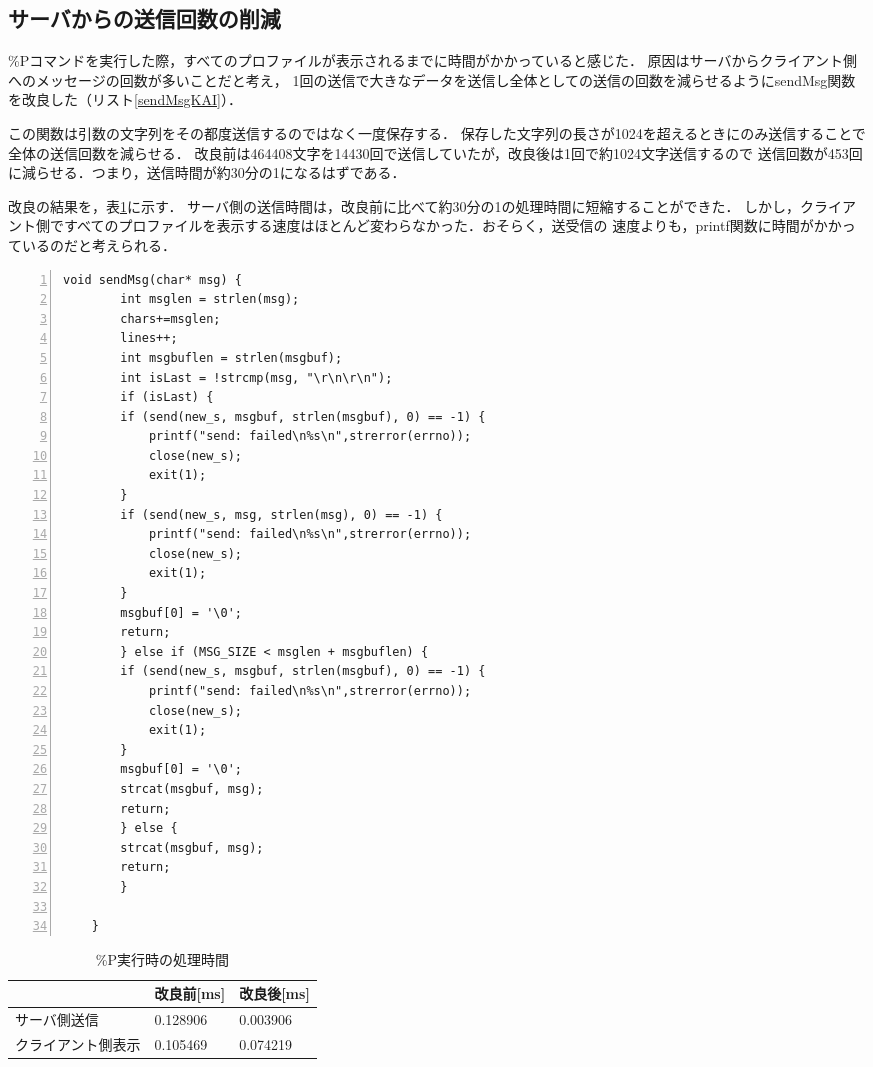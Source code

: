 \documentclass[11pt]{jarticle}
\begin{document}
\subsection{サーバからの送信回数の削減}

\%Pコマンドを実行した際，すべてのプロファイルが表示されるまでに時間がかかっていると感じた．
原因はサーバからクライアント側へのメッセージの回数が多いことだと考え，
1回の送信で大きなデータを送信し全体としての送信の回数を減らせるようにsendMsg関数を改良した（リスト\ref{sendMsgKAI}）．

この関数は引数の文字列をその都度送信するのではなく一度保存する．
保存した文字列の長さが1024を超えるときにのみ送信することで全体の送信回数を減らせる．
改良前は464408文字を14430回で送信していたが，改良後は1回で約1024文字送信するので
送信回数が453回に減らせる．つまり，送信時間が約30分の1になるはずである．

改良の結果を，表\ref{table:P}に示す．
サーバ側の送信時間は，改良前に比べて約30分の1の処理時間に短縮することができた．
しかし，クライアント側ですべてのプロファイルを表示する速度はほとんど変わらなかった．おそらく，送受信の
速度よりも，printf関数に時間がかかっているのだと考えられる．

\begin{lstlisting}[caption=改良したsendMsg,label=sendMsgKAI,numbers=left]
    void sendMsg(char* msg) {
        int msglen = strlen(msg);
        chars+=msglen;
        lines++;
        int msgbuflen = strlen(msgbuf);
        int isLast = !strcmp(msg, "\r\n\r\n");
        if (isLast) {
        if (send(new_s, msgbuf, strlen(msgbuf), 0) == -1) {
            printf("send: failed\n%s\n",strerror(errno));
            close(new_s);
            exit(1);
        }
        if (send(new_s, msg, strlen(msg), 0) == -1) {
            printf("send: failed\n%s\n",strerror(errno));
            close(new_s);
            exit(1);
        }
        msgbuf[0] = '\0';
        return;
        } else if (MSG_SIZE < msglen + msgbuflen) {
        if (send(new_s, msgbuf, strlen(msgbuf), 0) == -1) {
            printf("send: failed\n%s\n",strerror(errno));
            close(new_s);
            exit(1);
        }
        msgbuf[0] = '\0';
        strcat(msgbuf, msg);
        return;
        } else {
        strcat(msgbuf, msg);
        return;
        }
        
    } 
\end{lstlisting}

\begin{table}[h] \caption{\%P実行時の処理時間} \label{table:P}
    \begin{center}
        \begin{tabular}{l|l|l} \hline
             & 改良前[ms] & 改良後[ms] \\ \hline \hline
            サーバ側送信 & 0.128906 & 0.003906 \\ 
            クライアント側表示 & 0.105469 & 0.074219 \\ \hline
        \end{tabular}
    \end{center}
\end{table}
\end{document}
